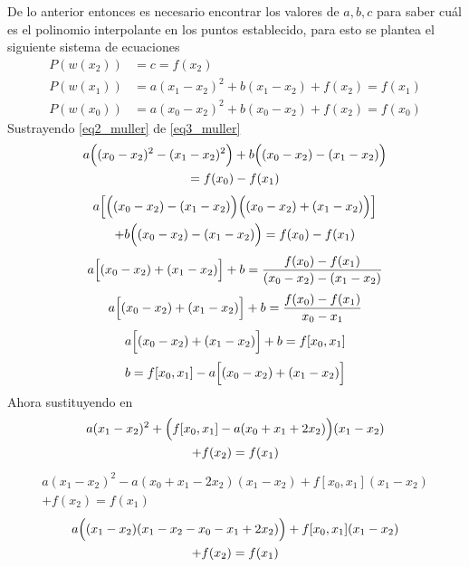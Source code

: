 De lo anterior entonces es necesario encontrar los valores de $a,b,c$
para saber cuál es el polinomio interpolante en los puntos establecido,
para esto se plantea el siguiente sistema de ecuaciones
\begin{align}
    \label{eq1_muller}P(w(x_2))&=c=f(x_2)\\
    \label{eq2_muller}P(w(x_1))&=a(x_1-x_2)^2+b(x_1-x_2)+f(x_2)=f(x_1)\\
    \label{eq3_muller}P(w(x_0))&=a(x_0-x_2)^2+b(x_0-x_2)+f(x_2)=f(x_0)
\end{align}
Sustrayendo \ref{eq2_muller} de \ref{eq3_muller}
\begin{multline*}
    a\Bigl((x_0-x_2)^2-(x_1-x_2)^2\Bigr)+b\Bigl((x_0-x_2)-(x_1-x_2)\Bigr)\\=f(x_0)-f(x_1)
\end{multline*}
\begin{multline*}
    a\Bigl[\Bigl((x_0-x_2)-(x_1-x_2)\Bigr)\Bigl((x_0-x_2)+(x_1-x_2)\Bigr)\Bigr]\\
    +b\Bigl((x_0-x_2)-(x_1-x_2)\Bigr)=f(x_0)-f(x_1)
\end{multline*}
\begin{multline*}
    a\Bigl[(x_0-x_2)+(x_1-x_2)\Bigr]+b=\frac{f(x_0)-f(x_1)}{(x_0-x_2)-(x_1-x_2)}
\end{multline*}
\begin{equation*}
    a\Bigl[(x_0-x_2)+(x_1-x_2)\Bigr]+b=\frac{f(x_0)-f(x_1)}{x_0-x_1}
\end{equation*}
\begin{equation*}
    a\Bigl[(x_0-x_2)+(x_1-x_2)\Bigr]+b=f[x_0,x_1]
\end{equation*}
\begin{equation}
    \label{eq4_muller}
    b=f[x_0,x_1]-a\Bigl[(x_0-x_2)+(x_1-x_2)\Bigr]
\end{equation}
Ahora sustituyendo  en 
\begin{multline*}
    a(x_1-x_2)^2+\Bigl(f[x_0,x_1]-a(x_0+x_1+2x_2)\Bigr)(x_1-x_2)\\
    +f(x_2)=f(x_1)
\end{multline*}
\begin{multline*}
    a(x_1-x_2)^2-a(x_0+x_1-2x_2)(x_1-x_2)+f[x_0,x_1](x_1-x_2)\\
    +f(x_2)=f(x_1)
\end{multline*}
\begin{multline*}
    a\Bigl((x_1-x_2)(x_1-x_2-x_0-x_1+2x_2)\Bigr)+f[x_0,x_1](x_1-x_2)\\+f(x_2)=f(x_1)
\end{multline*}
